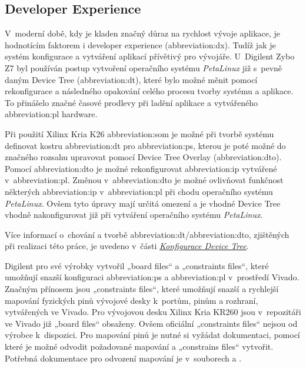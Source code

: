 \documentclass[a4paper, twoside, 11pt]{article}
\begin{document}
			\subsection{Developer Experience}
					V~moderní době, kdy je kladen značný důraz na rychlost vývoje aplikace, je hodnotícím faktorem i developer experience (\gls{abbreviation:dx}). Tudíž jak je systém konfigurace a vytváření aplikací přívětivý pro vývojáře. U~Digilent Zybo Z7 byl používán postup vytvoření operačního systému \textit{PetaLinux} již s~pevně daným Device Tree (\gls{abbreviation:dt}), které bylo možné měnit pomocí rekonfigurace a následného opakování celého procesu tvorby systému a aplikace. To přinášelo značné časové prodlevy při ladění aplikace a vytvářeného \gls{abbreviation:pl} hardware.\par
					Při použití Xilinx Kria K26 \gls{abbreviation:som} je možné při tvorbě systému definovat kostru \gls{abbreviation:dt} pro \gls{abbreviation:ps}, kterou je poté možné do značného rozsahu upravovat pomocí Device Tree Overlay (\gls{abbreviation:dto}). Pomocí \gls{abbreviation:dto} je možné rekonfigurovat \gls{abbreviation:ip} vytvářené v~\gls{abbreviation:pl}. Změnou v~\gls{abbreviation:dto} je možné ovlivňovat funkčnost některých \gls{abbreviation:ip} v~\gls{abbreviation:pl} při chodu operačního systému \textit{PetaLinux}. Ovšem tyto úpravy mají určitá omezení a je vhodné Device Tree vhodně nakonfigurovat již při vytváření operačního systému \textit{PetaLinux}.\par
					Více informací o~chování a tvorbě \gls{abbreviation:dt}/\gls{abbreviation:dto}, zjištěných při realizaci této práce, je uvedeno v~části \hyperref[subsubsec:konfigurace-device-tree]{\textit{Konfigurace Device Tree}}.\par
					Digilent pro své výrobky vytvořil „board files“ a „constraints files“, které umožňují snazší konfiguraci \gls{abbreviation:ps} a \gls{abbreviation:pl} v~prostředí Vivado. Značným přínosem jsou „constraints files“, které umožňují snazší a rychlejší mapování fyzických pinů vývojové desky k~portům, pinům a rozhraní, vytvářených ve Vivado. Pro vývojovou desku Xilinx Kria KR260 jsou v~repozitáři ve Vivado již „board files“ obsaženy. Ovšem oficiální „constraints files“ nejsou od výrobce k~dispozici. Pro mapování pinů je nutné si vyžádat dokumentaci, pomocí které je možné odvodit požadované mapování a „constrains files“ vytvořit. Potřebná dokumentace pro odvození mapování je v~souborech \cite{kria-kr260-starter-kit-cc-schematics} a \cite{kria-k26-som-xdc}.
\end{document}
